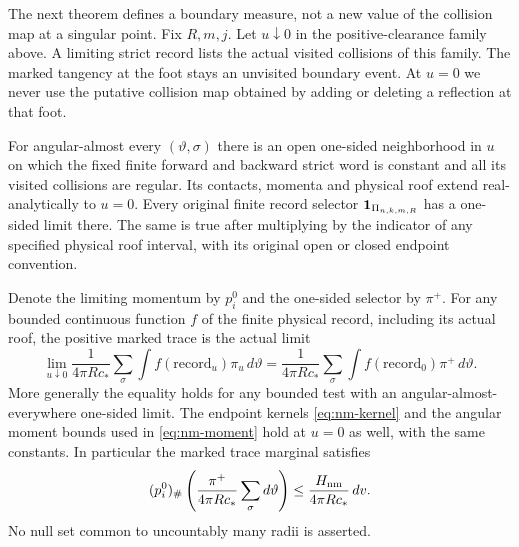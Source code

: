 The next theorem defines a boundary measure, not a new value of the
collision map at a singular point.  Fix $R,m,j$.  Let $u\downarrow0$
in the positive-clearance family above.  A limiting strict record
lists the actual visited collisions of this family.  The marked
tangency at the foot stays an unvisited boundary event.  At $u=0$
we never use the putative collision map obtained by adding or
deleting a reflection at that foot.

\begin{theorem}
\label{thm:nm-trace}
For angular-almost every $(\vartheta,\sigma)$ there is an open
one-sided neighborhood in $u$ on which the fixed finite forward
and backward strict word is constant and all its visited collisions
are regular.  Its contacts, momenta and physical roof extend
real-analytically to $u=0$.  Every original finite record selector
$\mathbf1_{\Pi_{n,k,m,R}}$ has a one-sided limit there.  The same is
true after multiplying by the indicator of any specified physical
roof interval, with its original open or closed endpoint convention.

Denote the limiting momentum by $p_i^0$ and the one-sided selector
by $\pi^+$.  For any bounded continuous function $f$ of the finite
physical record, including its actual roof, the positive marked
trace is the actual limit
\begin{equation}\label{eq:nm-trace}
 \lim_{u\downarrow0}\frac1{4\pi R c_*}
   \sum_\sigma\int f(\mathrm{record}_u)\pi_u\,d\vartheta
 =\frac1{4\pi R c_*}
   \sum_\sigma\int f(\mathrm{record}_0)\pi^+\,d\vartheta.
\end{equation}
More generally the equality holds for any bounded test with an
angular-almost-everywhere one-sided limit.  The endpoint kernels
\eqref{eq:nm-kernel} and the angular moment bounds used in
\eqref{eq:nm-moment} hold at $u=0$ as well, with the same constants.
In particular the marked trace marginal satisfies
\begin{equation}\label{eq:nm-trace-marginal}
 (p_i^0)_\#\left(\frac{\pi^+}{4\pi R c_*}
                          \sum_\sigma d\vartheta\right)
             \le\frac{H_{\rm nm}}{4\pi R c_*}\,dv.
\end{equation}
No null set common to uncountably many radii is asserted.
\end{theorem}
